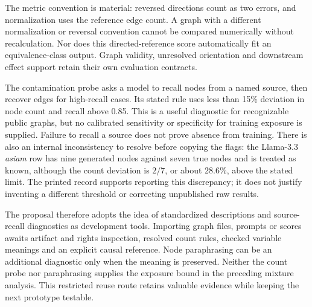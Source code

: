 The metric convention is material: reversed directions count as two errors,
and normalization uses the reference edge count. A graph with a different
normalization or reversal convention cannot be compared numerically without
recalculation. Nor does this directed-reference score automatically fit an
equivalence-class output. Graph validity, unresolved orientation and
downstream effect support retain their own evaluation contracts.
\citep{exec14_l7_causalgraphbench}

The contamination probe asks a model to recall nodes from a named source,
then recover edges for high-recall cases. Its stated rule uses less than
15\% deviation in node count and recall above 0.85. This is a useful
diagnostic for recognizable public graphs, but no calibrated sensitivity
or specificity for training exposure is supplied. Failure to recall a source
does not prove absence from training. There is also an internal inconsistency
to resolve before copying the flags: the Llama-3.3 \emph{asiam} row has nine
generated nodes against seven true nodes and is treated as known, although
the count deviation is \(2/7\), or about 28.6\%, above the stated limit.
The printed record supports reporting this discrepancy; it does not justify
inventing a different threshold or correcting unpublished raw results.
\citep{exec14_l7_causalgraphbench,exec14_l7_frontier_exact}

The proposal therefore adopts the idea of standardized descriptions and
source-recall diagnostics as development tools. Importing graph files,
prompts or scores awaits artifact and rights inspection, resolved count
rules, checked variable meanings and an explicit causal reference.
Node paraphrasing can be an additional diagnostic only when the meaning
is preserved. Neither the count probe nor paraphrasing supplies the
exposure bound in the preceding mixture analysis. This restricted reuse
route retains valuable evidence while keeping the next prototype testable.

\label{exec14:l7-frontier-end}
